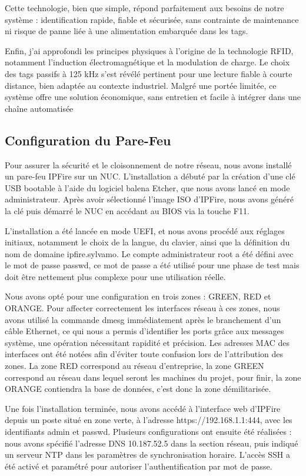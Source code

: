 \documentclass[main.tex]{subfiles}
\begin{document}
Cette technologie, bien que simple, répond parfaitement aux besoins de notre système : identification rapide, fiable et sécurisée, sans contrainte de maintenance ni risque de panne liée à une alimentation embarquée dans les tags.

Enfin, j’ai approfondi les principes physiques à l’origine de la technologie RFID, notamment l’induction électromagnétique et la modulation de charge. Le choix des tags passifs à 125 kHz s’est révélé pertinent pour une lecture fiable à courte distance, bien adaptée au contexte industriel. Malgré une portée limitée, ce système offre une solution économique, sans entretien et facile à intégrer dans une chaîne automatisée

\subsection{Configuration du Pare-Feu}

\quad Pour assurer la sécurité et le cloisonnement de notre réseau, nous avons installé un pare-feu IPFire sur un NUC. L’installation a débuté par la création d’une clé USB bootable à l’aide du logiciel balena Etcher, que nous avons lancé en mode administrateur. Après avoir sélectionné l’image ISO d’IPFire, nous avons généré la clé puis démarré le NUC en accédant au BIOS via la touche F11.

L’installation a été lancée en mode UEFI, et nous avons procédé aux réglages initiaux, notamment le choix de la langue, du clavier, ainsi que la définition du nom de domaine ipfire.sylvamo. Le compte administrateur root a été défini avec le mot de passe passwd, ce mot de passe a été utilisé pour une phase de test mais doit être nettement plus complexe pour une utilisation réelle.

Nous avons opté pour une configuration en trois zones : GREEN, RED et ORANGE. Pour affecter correctement les interfaces réseau à ces zones, nous avons utilisé la commande dmesg immédiatement après le branchement d’un câble Ethernet, ce qui nous a permis d’identifier les ports grâce aux messages système, une opération nécessitant rapidité et précision. Les adresses MAC des interfaces ont été notées afin d’éviter toute confusion lors de l’attribution des zones. La zone RED correspond au réseau d’entreprise, la zone GREEN correspond au réseau dans lequel seront les machines du projet, pour finir, la zone ORANGE contiendra la base de données, c’est donc la zone démilitarisée.

Une fois l’installation terminée, nous avons accédé à l’interface web d’IPFire depuis un poste situé en zone verte, à l’adresse https://192.168.1.1:444, avec les identifiants admin et passwd. Plusieurs configurations ont ensuite été réalisées : nous avons spécifié l’adresse DNS 10.187.52.5 dans la section réseau, puis indiqué un serveur NTP dans les paramètres de synchronisation horaire. L’accès SSH a été activé et paramétré pour autoriser l’authentification par mot de passe.
\end{document}
